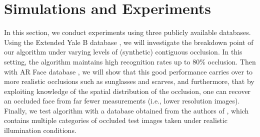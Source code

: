 \section{Simulations and Experiments} \label{sec:experiments}

In this section, we conduct experiments using three publicly available databases. Using the Extended Yale B database \cite{Georghiades2001-PAMI,Lee2005-PAMI}, we will investigate the breakdown point of our algorithm under varying levels of (synthetic) contiguous occlusion. In this setting, the algorithm maintains high recognition rates up to 80\% occlusion. Then with AR Face database \cite{Martinez1998-report}, we will show that this good performance carries over to more realistic occlusions such as sunglasses and scarves, and furthermore, that by exploiting knowledge of the spatial distribution of the occlusion, one can recover an occluded face from far fewer measurements (i.e., lower resolution images). Finally, we test algorithm with a database obtained from the authors of  \cite{Wagner2009-CVPR}, which contains multiple categories of occluded test images taken under realistic illumination conditions. \vspace{-0mm}

